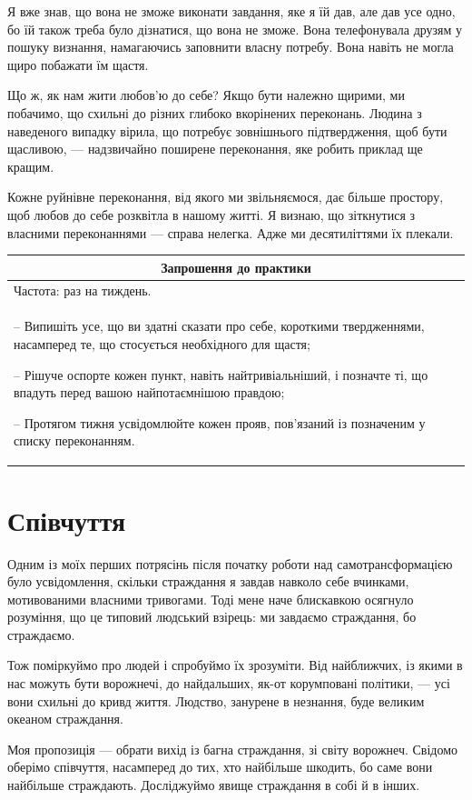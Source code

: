 \documentclass[oneside, 12pt]{book}
\newenvironment{prat}[1]
{\begin{center}
\begin{tabular}{p{0.9\textwidth}}
\hline\hline
\multicolumn{1}{c}{Запрошення до практики}\\
\hline
Частота: #1.\\
\hline
}{\\
\hline\hline
\end{tabular} 
\end{center}}
\begin{document}
Я вже знав, що вона не зможе виконати завдання, яке я їй дав, але дав усе одно, бо їй також треба було дізнатися, що вона не зможе. Вона телефонувала друзям у пошуку визнання, намагаючись заповнити власну потребу. Вона навіть не могла щиро побажати їм щастя.

Що ж, як нам жити любов'ю до себе? Якщо бути належно щирими, ми побачимо, що схильні до різних глибоко вкорінених переконань. Людина з наведеного випадку вірила, що потребує зовнішнього підтвердження, щоб бути щасливою, --- надзвичайно поширене переконання, яке робить приклад ще кращим.

Кожне руйнівне переконання, від якого ми звільняємося, дає більше простору, щоб любов до себе розквітла в нашому житті. Я визнаю, що зіткнутися з власними переконаннями --- справа нелегка. Адже ми десятиліттями їх плекали.

\begin{prat}{раз на тиждень}
-- Випишіть усе, що ви здатні сказати про себе, короткими твердженнями, насамперед те, що стосується необхідного для щастя;

-- Рішуче оспорте кожен пункт, навіть найтривіальніший, і позначте ті, що впадуть перед вашою найпотаємнішою правдою;

-- Протягом тижня усвідомлюйте кожен прояв, пов'язаний із позначеним у списку переконанням.
\end{prat}

\section*{Співчуття}

Одним із моїх перших потрясінь після початку роботи над самотрансформацією було усвідомлення, скільки страждання я завдав навколо себе вчинками, мотивованими власними тривогами. Тоді мене наче блискавкою осягнуло розуміння, що це типовий людський взірець: ми завдаємо страждання, бо страждаємо.

Тож поміркуймо про людей і спробуймо їх зрозуміти. Від найближчих, із якими в нас можуть бути ворожнечі, до найдальших, як-от корумповані політики, --- усі вони схильні до кривд життя. Людство, занурене в незнання, буде великим океаном страждання.

Моя пропозиція --- обрати вихід із багна страждання, зі світу ворожнеч. Свідомо оберімо співчуття, насамперед до тих, хто найбільше шкодить, бо саме вони найбільше страждають. Досліджуймо явище страждання в собі й в інших.
\end{document}
